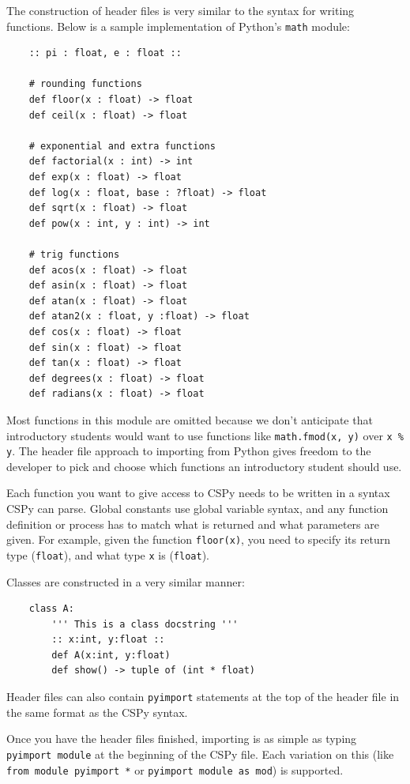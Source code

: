 \documentclass{article}
\begin{document}
The construction of header files is very similar to the syntax for writing functions. Below is a sample implementation of Python's \verb|math| module:
\begin{verbatim}
    :: pi : float, e : float ::

    # rounding functions
    def floor(x : float) -> float
    def ceil(x : float) -> float

    # exponential and extra functions
    def factorial(x : int) -> int
    def exp(x : float) -> float
    def log(x : float, base : ?float) -> float
    def sqrt(x : float) -> float
    def pow(x : int, y : int) -> int

    # trig functions
    def acos(x : float) -> float
    def asin(x : float) -> float
    def atan(x : float) -> float
    def atan2(x : float, y :float) -> float
    def cos(x : float) -> float
    def sin(x : float) -> float
    def tan(x : float) -> float
    def degrees(x : float) -> float
    def radians(x : float) -> float
\end{verbatim}

Most functions in this module are omitted because we don't anticipate that introductory students would want to use functions like \verb|math.fmod(x, y)| over \verb|x % y|. The header file approach to importing from Python gives freedom to the developer to pick and choose which functions an introductory student should use.

Each function you want to give access to CSPy needs to be written in a syntax CSPy can parse. Global constants use global variable syntax, and any function definition or process has to match what is returned and what parameters are given. For example, given the function \verb|floor(x)|, you need to specify its return type (\verb|float|), and what type \verb|x| is (\verb|float|).

Classes are constructed in a very similar manner:
\begin{verbatim}
    class A:
        ''' This is a class docstring '''
        :: x:int, y:float ::
        def A(x:int, y:float)
        def show() -> tuple of (int * float)
\end{verbatim}

Header files can also contain \verb|pyimport| statements at the top of the header file in the same format as the CSPy syntax.

Once you have the header files finished, importing is as simple as typing \verb|pyimport module| at the beginning of the CSPy file. Each variation on this (like \verb|from module pyimport *| or \verb|pyimport module as mod|) is supported.
\end{document}
